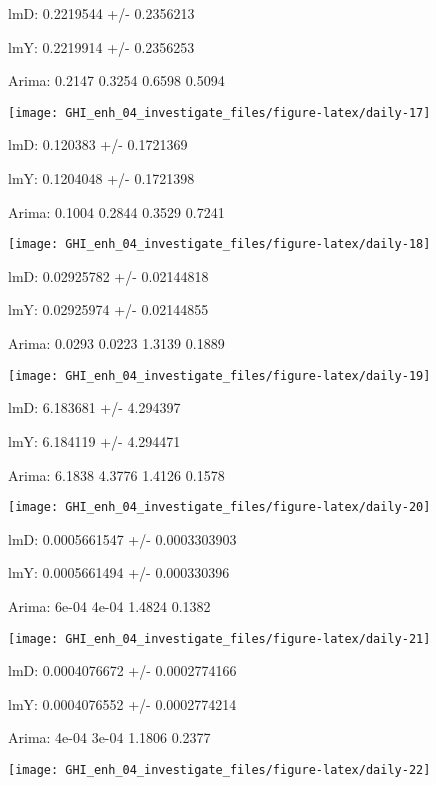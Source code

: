 \documentclass[
  10pt,
  a4paper,oneside]{article}
\begin{document}
lmD: 0.2219544 +/- 0.2356213

lmY: 0.2219914 +/- 0.2356253

Arima: 0.2147 0.3254 0.6598 0.5094

\begin{center}\texttt{[image: GHI\_enh\_04\_investigate\_files/figure-latex/daily-17]} \end{center}

lmD: 0.120383 +/- 0.1721369

lmY: 0.1204048 +/- 0.1721398

Arima: 0.1004 0.2844 0.3529 0.7241

\begin{center}\texttt{[image: GHI\_enh\_04\_investigate\_files/figure-latex/daily-18]} \end{center}

lmD: 0.02925782 +/- 0.02144818

lmY: 0.02925974 +/- 0.02144855

Arima: 0.0293 0.0223 1.3139 0.1889

\begin{center}\texttt{[image: GHI\_enh\_04\_investigate\_files/figure-latex/daily-19]} \end{center}

lmD: 6.183681 +/- 4.294397

lmY: 6.184119 +/- 4.294471

Arima: 6.1838 4.3776 1.4126 0.1578

\begin{center}\texttt{[image: GHI\_enh\_04\_investigate\_files/figure-latex/daily-20]} \end{center}

lmD: 0.0005661547 +/- 0.0003303903

lmY: 0.0005661494 +/- 0.000330396

Arima: 6e-04 4e-04 1.4824 0.1382

\begin{center}\texttt{[image: GHI\_enh\_04\_investigate\_files/figure-latex/daily-21]} \end{center}

lmD: 0.0004076672 +/- 0.0002774166

lmY: 0.0004076552 +/- 0.0002774214

Arima: 4e-04 3e-04 1.1806 0.2377

\begin{center}\texttt{[image: GHI\_enh\_04\_investigate\_files/figure-latex/daily-22]} \end{center}
\end{document}
